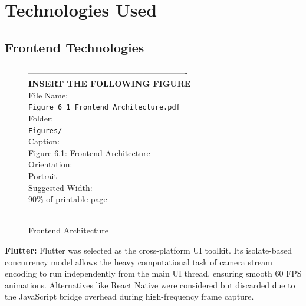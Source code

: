 \chapter{Technologies Used}

\section{Frontend Technologies}
\vspace{1em}
\begin{figure}[htbp]
\begin{center}
----------------------------------------------------------\\
\vspace{0.5em}
\textbf{INSERT THE FOLLOWING FIGURE}\\
\vspace{1em}
File Name:\\
\texttt{Figure\_6\_1\_Frontend\_Architecture.pdf}\\
\vspace{1em}
Folder:\\
\texttt{Figures/}\\
\vspace{1em}
Caption:\\
Figure 6.1: Frontend Architecture\\
\vspace{1em}
Orientation:\\
Portrait\\
\vspace{1em}
Suggested Width:\\
90\% of printable page\\
\vspace{3cm}
----------------------------------------------------------
\end{center}
\caption{Frontend Architecture}
\label{fig:diag_3}
\end{figure}
\vspace{1em}
\textbf{Flutter:} Flutter was selected as the cross-platform UI toolkit. Its isolate-based concurrency model allows the heavy computational task of camera stream encoding to run independently from the main UI thread, ensuring smooth 60 FPS animations. Alternatives like React Native were considered but discarded due to the JavaScript bridge overhead during high-frequency frame capture.

